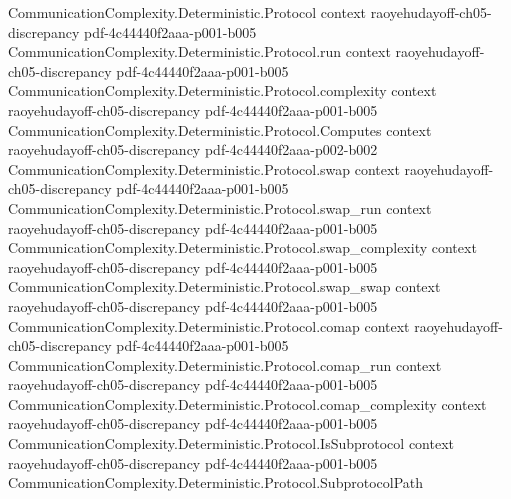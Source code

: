 \begin{lemma}
\label{CommunicationComplexity.Deterministic.Protocol.signedBias_eq_sum_rectangles}
\leanok
{}
\proofstep
  {CommunicationComplexity.Deterministic.Protocol}
  {context}
  {raoyehudayoff-ch05-discrepancy}
  {pdf-4c44440f2aaa-p001-b005}
\proofstep
  {CommunicationComplexity.Deterministic.Protocol.run}
  {context}
  {raoyehudayoff-ch05-discrepancy}
  {pdf-4c44440f2aaa-p001-b005}
\proofstep
  {CommunicationComplexity.Deterministic.Protocol.complexity}
  {context}
  {raoyehudayoff-ch05-discrepancy}
  {pdf-4c44440f2aaa-p001-b005}
\proofstep
  {CommunicationComplexity.Deterministic.Protocol.Computes}
  {context}
  {raoyehudayoff-ch05-discrepancy}
  {pdf-4c44440f2aaa-p002-b002}
\proofstep
  {CommunicationComplexity.Deterministic.Protocol.swap}
  {context}
  {raoyehudayoff-ch05-discrepancy}
  {pdf-4c44440f2aaa-p001-b005}
\proofstep
  {CommunicationComplexity.Deterministic.Protocol.swap_run}
  {context}
  {raoyehudayoff-ch05-discrepancy}
  {pdf-4c44440f2aaa-p001-b005}
\proofstep
  {CommunicationComplexity.Deterministic.Protocol.swap_complexity}
  {context}
  {raoyehudayoff-ch05-discrepancy}
  {pdf-4c44440f2aaa-p001-b005}
\proofstep
  {CommunicationComplexity.Deterministic.Protocol.swap_swap}
  {context}
  {raoyehudayoff-ch05-discrepancy}
  {pdf-4c44440f2aaa-p001-b005}
\proofstep
  {CommunicationComplexity.Deterministic.Protocol.comap}
  {context}
  {raoyehudayoff-ch05-discrepancy}
  {pdf-4c44440f2aaa-p001-b005}
\proofstep
  {CommunicationComplexity.Deterministic.Protocol.comap_run}
  {context}
  {raoyehudayoff-ch05-discrepancy}
  {pdf-4c44440f2aaa-p001-b005}
\proofstep
  {CommunicationComplexity.Deterministic.Protocol.comap_complexity}
  {context}
  {raoyehudayoff-ch05-discrepancy}
  {pdf-4c44440f2aaa-p001-b005}
\proofstep
  {CommunicationComplexity.Deterministic.Protocol.IsSubprotocol}
  {context}
  {raoyehudayoff-ch05-discrepancy}
  {pdf-4c44440f2aaa-p001-b005}
\proofstep
  {CommunicationComplexity.Deterministic.Protocol.SubprotocolPath}

\end{lemma}
